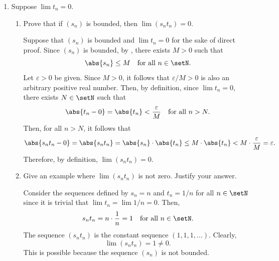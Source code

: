 \begin{enumerate}
\begin{enumerate}
\begin{subanswer}
      Next, suppose for the sake of contradiction that \(\lim s_n\) exists.
      Then, by definition, there exists \(s \in \setR\). 
      Let \(\varepsilon = 1\). There exists \(N \in \setN\) such that 
      \[
        \abs{s_n - s} < 1 \quad\text{for all } n > N.
      \]
      Now, choose \(k \in \setN\) such that \(2k > N\).
      Since \(s_n\) alternates, \(s_{2k} = 1\) and \(s_{2k+1} = -1\).
      Since \(2k > N\) and \(2k+1 > N\), it follows that
      \[
        2 = \abs{1 - (-1)} = \abs{s_{2k} - s_{2k+1}} \leq \abs{s_{2k} - s} + \abs{s - s_{2k+1}} < 1 + 1 = 2.
      \]
      This implies \(2 < 2\), which is a contradiction. 
      Therefore, \(\lim s_n\) does not exist.
    \end{subanswer}
  \end{enumerate}



  \newpage

  \item Suppose \(\lim t_n = 0\).
  \begin{enumerate}
    \item Prove that if \((s_n)\) is bounded, then \(\lim (s_n t_n) = 0\).
    \begin{subprove}
      Suppose that \((s_n)\) is bounded and \(\lim t_n = 0\) for the sake of direct proof.
      Since \((s_n)\) is bounded, by , there exists \(M > 0\) such that
      \[
        \abs{s_n} \leq M \quad\text{for all } n \in \setN.
      \]
      Let \(\varepsilon > 0\) be given. Since \(M > 0\), it follows that \(\varepsilon / M > 0\) 
      is also an arbitrary positive real number.
      Then, by definition, since \(\lim t_n = 0\),
      there exists \(N \in \setN\) such that 
      \[
        \abs{t_n - 0} = \abs{t_n} < \frac{\varepsilon}{M} \quad\text{for all } n > N.
      \]
      Then, for all \(n > N\), it follows that
      \[
        \abs{s_n t_n - 0} = \abs{s_n t_n} = \abs{s_n} \cdot \abs{t_n} \leq M \cdot \abs{t_n} < M \cdot \frac{\varepsilon}{M} = \varepsilon.
      \]
      Therefore, by definition, \(\lim (s_n t_n) = 0\).
    \end{subprove}
    \item Give an example where \(\lim (s_n t_n)\) is not zero. Justify your answer.
    \begin{subanswer}
      Consider the sequences defined by \(s_n = n\) and \(t_n = 1/n\) for all \(n \in \setN\)
      since it is trivial that \(\lim t_n = \lim 1/n = 0\). Then, 
      \[
        s_n t_n = n \cdot \frac{1}{n} = 1 \quad\text{for all } n \in \setN.
      \]
      The sequence \((s_n t_n)\) is the constant sequence \((1, 1, 1, \dots)\).
      Clearly,
      \[
        \lim (s_n t_n) = 1 \neq 0.
      \]
      This is possible because the sequence \((s_n)\) is not bounded.
    \end{subanswer}
  \end{enumerate}



\end{enumerate}
